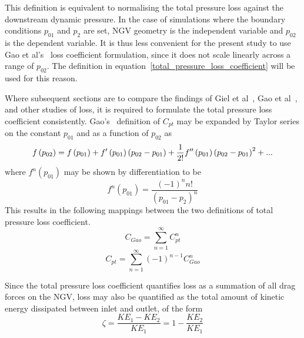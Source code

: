 \documentclass[a4paper, 11pt, oneside]{report}
\begin{document}
This definition is equivalent to normalising the total pressure loss against the downstream dynamic pressure. In the case of simulations where the boundary conditions $p_{01}$ and $p_2$ are set, NGV geometry is the independent variable and $p_{02}$ is the dependent variable. It is thus less convenient for the present study to use Gao et al's~\cite{gao_te} loss coefficient formulation, since it does not scale linearly across a range of $p_{02}$. The definition in equation~\ref{total_pressure_loss_coefficient} will be used for this reason.

Where subsequent sections are to compare the findings of Giel et al~\cite{giel_te_thickness}, Gao et al~\cite{gao_te}, and other studies of loss, it is required to formulate the total pressure loss coefficient consistently. Gao's~\cite{gao_te} definition of $C_{pt}$ may be expanded by Taylor series on the constant $p_{01}$ and as a function of $p_{02}$ as
\begin{equation}
f\left(p_{02}\right) = \\
f\left(p_{01}\right) +
f'\left(p_{01}\right) \left(p_{02} - p_{01}\right) +
\frac{1}{2!} f''\left(p_{01}\right) \left(p_{02} - p_{01}\right)^2 +
...
\end{equation}
where $f^n\left(p_{01}\right)$ may be shown by differentiation to be
\begin{equation}
f^n\left(p_{01}\right) =
\frac{
	\left(-1\right)^n n !
}{
	(p_{01} - p_2)^n
}
\end{equation}
This results in the following mappings between the two definitions of total pressure loss coefficient.
\begin{equation}
C_{Gao} = 
\sum_{n=1}^{\infty}
C_{pt}^n
\end{equation}
\begin{equation}
C_{pt} = 
\sum_{n=1}^{\infty}
\left(-1\right)^{n-1}
C_{Gao}^n
\end{equation}

Since the total pressure loss coefficient quantifies loss as a summation of all drag forces on the NGV, loss may also be quantified as the total amount of kinetic energy dissipated between inlet and outlet, of the form
\begin{equation}\label{ke_loss_form}
\zeta =
\frac{KE_1 - KE_2}{KE_1}
=
1 - \frac{KE_2}{KE_1}
\end{equation}
\end{document}
